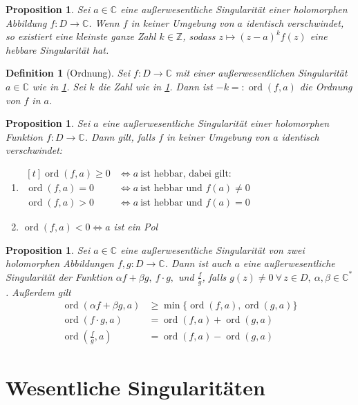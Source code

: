 \documentclass[a4paper,12pt]{book}
\theoremstyle{newthm}
\newtheorem{prop}[thm]{Proposition}
\theoremstyle{newdef}
\newtheorem{defn}[thm]{Definition}
\theoremstyle{newrem}
\newcommand{\Z}{\mathbb{Z}}
\newcommand{\C}{\mathbb{C}}
\newcommand{\ord}[2]{\operatorname{ord} \left( #1,#2 \right)}
\begin{document}
		\begin{prop}\label{3.1.5}
			Sei $a \in \C$ eine außerwesentliche Singularität einer holomorphen Abbildung $ f: D \to \C $. Wenn $f$ in keiner Umgebung von $a$ identisch verschwindet, so existiert eine kleinste ganze Zahl $k \in \Z$, sodass $ z \mapsto (z-a)^kf(z) $ eine hebbare Singularität hat.
		\end{prop}
		
		\begin{defn}[Ordnung]
			Sei $ f: D \to \C $ mit einer außerwesentlichen Singularität $ a \in \C $ wie in \ref{3.1.5}. Sei $k$ die Zahl wie in \ref{3.1.5}. Dann ist $ -k =: \ord{f}{a} $ die Ordnung von $f$ in $a$.
		\end{defn}
		
		\begin{prop}
			Sei $a$ eine außerwesentliche Singularität einer holomorphen Funktion $f: D \to \C$. Dann gilt, falls $f$ in keiner Umgebung von $a$ identisch verschwindet:
			\begin{enumerate}[label={\roman*})]
				\item $\begin{aligned}[t]
					\ord{f}{a} \geq 0 &\iff a\ \text{ist hebbar, dabei gilt:}\\
					\ord{f}{a} = 0 &\iff a\ \text{ist hebbar und } f(a) \neq 0\\
					\ord{f}{a} > 0 &\iff a\ \text{ist hebbar und } f(a) = 0
				\end{aligned}$
				\item $ \ord{f}{a} < 0 \iff a $ ist ein Pol
			\end{enumerate}
		\end{prop}
		
		\begin{prop}
			Sei $ a \in \C $ eine außerwesentliche Singularität von zwei holomorphen Abbildungen $ f,g: D \to \C $. Dann ist auch $a$ eine außerwesentliche Singularität der Funktion $ \alpha f + \beta g,\ f \cdot g, $ und $ \frac{f}{g} $, falls $g(z) \neq 0 \ \forall\, z \in D,\ \alpha,\beta \in \C^*$.	Außerdem gilt
			\begin{align*}
				\ord{\alpha f + \beta g}{a} &\geq \min\{\ord{f}{a},\ord{g}{a}\}\\
				\ord{f\cdot g}{a} &= \ord{f}{a} + \ord{g}{a}\\
				\ord{\frac{f}{g}}{a} &= \ord{f}{a} - \ord{g}{a}
			\end{align*}
		\end{prop}
		
	
	\section{Wesentliche Singularitäten}
		
\end{document}
